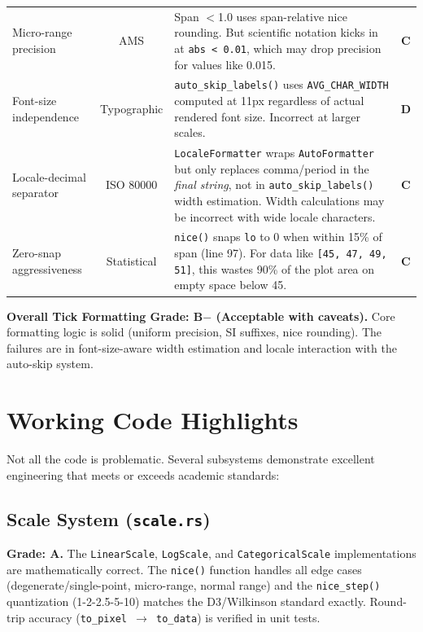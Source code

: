 \documentclass[11pt,a4paper]{article}
\begin{document}
\begin{longtable}{p{3.5cm} c p{5.5cm} c}
Micro-range precision & AMS & Span $<$1.0 uses span-relative nice rounding.
  But scientific notation kicks in at \texttt{abs < 0.01}, which may drop
  precision for values like 0.015. & \textcolor{warningyellow}{\textbf{C}} \\[4pt]

Font-size independence & Typographic & \texttt{auto\_skip\_labels()} uses
  \texttt{AVG\_CHAR\_WIDTH} computed at 11px regardless of
  actual rendered font size. Incorrect at larger scales. &
  \textcolor{googred}{\textbf{D}} \\[4pt]

Locale-decimal separator & ISO 80000 & \texttt{LocaleFormatter} wraps
  \texttt{AutoFormatter} but only replaces comma/period in the \emph{final string},
  not in \texttt{auto\_skip\_labels()} width estimation. Width calculations
  may be incorrect with wide locale characters. & \textcolor{warningyellow}{\textbf{C}} \\[4pt]

Zero-snap aggressiveness & Statistical & \texttt{nice()} snaps \texttt{lo}
  to 0 when within 15\% of span (line 97). For data like
  \texttt{[45, 47, 49, 51]}, this wastes 90\% of the plot area on empty
  space below 45. & \textcolor{warningyellow}{\textbf{C}} \\
\bottomrule
\end{longtable}

\begin{warningbox}
\textbf{Overall Tick Formatting Grade: B$-$ (Acceptable with caveats).}
Core formatting logic is solid (uniform precision, SI suffixes, nice rounding).
The failures are in font-size-aware width estimation and locale interaction
with the auto-skip system.
\end{warningbox}

\section{Working Code Highlights}

Not all the code is problematic. Several subsystems demonstrate excellent
engineering that meets or exceeds academic standards:

\subsection{Scale System (\texttt{scale.rs})}

\begin{strengthbox}
\textbf{Grade: A.}
The \texttt{LinearScale}, \texttt{LogScale}, and \texttt{CategoricalScale}
implementations are mathematically correct. The \texttt{nice()} function
handles all edge cases (degenerate/single-point, micro-range, normal range)
and the \texttt{nice\_step()} quantization (1-2-2.5-5-10) matches the
D3/Wilkinson standard exactly. Round-trip accuracy (\texttt{to\_pixel $\to$
to\_data}) is verified in unit tests.
\end{strengthbox}
\end{document}
